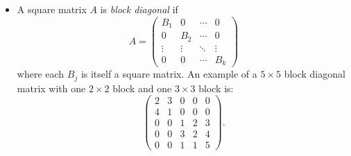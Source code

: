 \documentclass{ximera}
\begin{document}
\begin{itemize}
\item A square matrix $A$ is {\em block diagonal\/}
 if
\[
A = \left(\begin{array}{cccc} B_1 & 0 & \cdots & 0 \\
0 & B_2 & \cdots & 0 \\ \vdots & \vdots & \ddots & \vdots \\
0 & 0 & \cdots & B_k \end{array} \right)
\]
where each $B_j$ is itself a square matrix. An example of a $5\times 5$
block diagonal matrix with one $2\times 2$ block and one $3\times 3$ block is:
\[
\left(\begin{array}{ccccc} 2 & 3 & 0 & 0 & 0\\ 4 & 1 & 0 & 0 & 0\\
0 & 0 & 1 & 2 & 3\\ 0 & 0 & 3 & 2 & 4\\ 0 & 0 & 1 & 1 & 5\end{array}\right).
\]


\end{itemize}

\EXER

\TEXER
\end{document}
